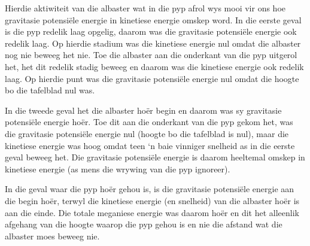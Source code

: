  Hierdie aktiwiteit van die albaster wat in die pyp afrol wys mooi vir ons hoe gravitasie potensiële energie in kinetiese energie omskep word. In die eerste geval is die pyp redelik laag opgelig, daarom was die gravitasie potensiële energie ook redelik laag. Op hierdie stadium was die kinetiese energie nul omdat die albaster nog nie beweeg het nie. Toe die albaster aan die onderkant van die pyp uitgerol het, het dit redelik stadig beweeg en daarom was die kinetiese energie ook redelik laag. Op hierdie punt was die gravitasie potensiële energie nul omdat die hoogte bo die tafelblad nul was.

In die tweede geval het die albaster hoër begin en daarom was sy gravitasie potensiële energie hoër.  Toe dit aan die onderkant van die pyp gekom het, was die gravitasie potensiële energie nul (hoogte bo die tafelblad is nul), maar die kinetiese energie was hoog omdat teen ‘n baie vinniger snelheid as in die eerste geval beweeg het. Die gravitasie potensiële energie is daarom heeltemal omskep in kinetiese energie (as mens die wrywing van die pyp ignoreer).

In die geval waar die pyp hoër gehou is, is die gravitasie potensiële energie aan die begin hoër, terwyl die kinetiese energie (en snelheid) van die albaster hoër is aan die einde. Die totale meganiese energie was daarom hoër en dit het alleenlik afgehang van die hoogte waarop die pyp gehou is en nie die afstand wat die albaster moes beweeg nie.


